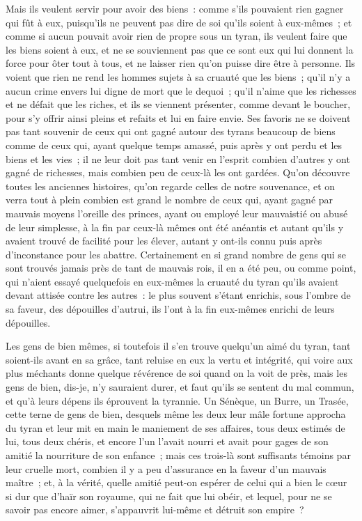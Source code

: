\documentclass[french,twoside]{book} %
\begin{document}
Mais ils veulent servir pour avoir des biens : comme s’ils pouvaient rien gagner qui fût à eux, puisqu’ils ne peuvent pas dire de soi qu’ils soient à eux-mêmes ; et comme si aucun pouvait avoir rien de propre sous un tyran, ils veulent faire que les biens soient à eux, et ne se souviennent pas que ce sont eux qui lui donnent la force pour ôter tout à tous, et ne laisser rien qu’on puisse dire être à personne. Ils voient que rien ne rend les hommes sujets à sa cruauté que les biens ; qu’il n’y a aucun crime envers lui digne de mort que le dequoi ; qu’il n’aime que les richesses et ne défait que les riches, et ils se viennent présenter, comme devant le boucher, pour s’y offrir ainsi pleins et refaits et lui en faire envie. Ses favoris ne se doivent pas tant souvenir de ceux qui ont gagné autour des tyrans beaucoup de biens comme de ceux qui, ayant quelque temps amassé, puis après y ont perdu et les biens et les vies ; il ne leur doit pas tant venir en l’esprit combien d’autres y ont gagné de richesses, mais combien peu de ceux-là les ont gardées. Qu’on découvre toutes les anciennes histoires, qu’on regarde celles de notre souvenance, et on verra tout à plein combien est grand le nombre de ceux qui, ayant gagné par mauvais moyens l’oreille des princes, ayant ou employé leur mauvaistié ou abusé de leur simplesse, à la fin par ceux-là mêmes ont été anéantis et autant qu’ils y avaient trouvé de facilité pour les élever, autant y ont-ils connu puis après d’inconstance pour les abattre. Certainement en si grand nombre de gens qui se sont trouvés jamais près de tant de mauvais rois, il en a été peu, ou comme point, qui n’aient essayé quelquefois en eux-mêmes la cruauté du tyran qu’ils avaient devant attisée contre les autres : le plus souvent s’étant enrichis, sous l’ombre de sa faveur, des dépouilles d’autrui, ils l’ont à la fin eux-mêmes enrichi de leurs dépouilles.\par
Les gens de bien mêmes, si toutefois il s’en trouve quelqu’un aimé du tyran, tant soient-ils avant en sa grâce, tant reluise en eux la vertu et intégrité, qui voire aux plus méchants donne quelque révérence de soi quand on la voit de près, mais les gens de bien, dis-je, n’y sauraient durer, et faut qu’ils se sentent du mal commun, et qu’à leurs dépens ils éprouvent la tyrannie. Un Sénèque, un Burre, un Trasée, cette terne de gens de bien, desquels même les deux leur mâle fortune approcha du tyran et leur mit en main le maniement de ses affaires, tous deux estimés de lui, tous deux chéris, et encore l’un l’avait nourri et avait pour gages de son amitié la nourriture de son enfance ; mais ces trois-là sont suffisants témoins par leur cruelle mort, combien il y a peu d’assurance en la faveur d’un mauvais maître ; et, à la vérité, quelle amitié peut-on espérer de celui qui a bien le cœur si dur que d’haïr son royaume, qui ne fait que lui obéir, et lequel, pour ne se savoir pas encore aimer, s’appauvrit lui-même et détruit son empire ?\par
\end{document}

